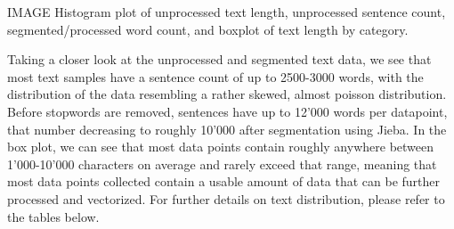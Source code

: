 \documentclass[
  titlepage]{article}
\begin{document}
IMAGE Histogram plot of unprocessed text length, unprocessed sentence
count, segmented/processed word count, and boxplot of text length by
category.

Taking a closer look at the unprocessed and segmented text data, we see
that most text samples have a sentence count of up to 2500-3000 words,
with the distribution of the data resembling a rather skewed, almost
poisson distribution. Before stopwords are removed, sentences have up to
12'000 words per datapoint, that number decreasing to roughly 10'000
after segmentation using Jieba. In the box plot, we can see that most
data points contain roughly anywhere between 1'000-10'000 characters on
average and rarely exceed that range, meaning that most data points
collected contain a usable amount of data that can be further processed
and vectorized. For further details on text distribution, please refer
to the tables below.
\end{document}

